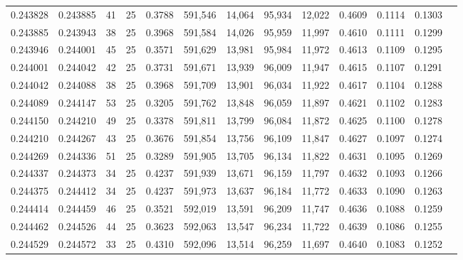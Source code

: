 \begin{tabular}{rrrrrrrrrrrrr}
0.243828 & 0.243885 &    41 &  25 &                                     0.3788 & 591,546 &  14,064 &  95,934 &  12,022 & 0.4609 & 0.1114 & 0.1303 \\
0.243885 & 0.243943 &    38 &  25 &                                     0.3968 & 591,584 &  14,026 &  95,959 &  11,997 & 0.4610 & 0.1111 & 0.1299 \\
0.243946 & 0.244001 &    45 &  25 &                                     0.3571 & 591,629 &  13,981 &  95,984 &  11,972 & 0.4613 & 0.1109 & 0.1295 \\
0.244001 & 0.244042 &    42 &  25 &                                     0.3731 & 591,671 &  13,939 &  96,009 &  11,947 & 0.4615 & 0.1107 & 0.1291 \\
0.244042 & 0.244088 &    38 &  25 &                                     0.3968 & 591,709 &  13,901 &  96,034 &  11,922 & 0.4617 & 0.1104 & 0.1288 \\
0.244089 & 0.244147 &    53 &  25 &                                     0.3205 & 591,762 &  13,848 &  96,059 &  11,897 & 0.4621 & 0.1102 & 0.1283 \\
0.244150 & 0.244210 &    49 &  25 &                                     0.3378 & 591,811 &  13,799 &  96,084 &  11,872 & 0.4625 & 0.1100 & 0.1278 \\
0.244210 & 0.244267 &    43 &  25 &                                     0.3676 & 591,854 &  13,756 &  96,109 &  11,847 & 0.4627 & 0.1097 & 0.1274 \\
0.244269 & 0.244336 &    51 &  25 &                                     0.3289 & 591,905 &  13,705 &  96,134 &  11,822 & 0.4631 & 0.1095 & 0.1269 \\
0.244337 & 0.244373 &    34 &  25 &                                     0.4237 & 591,939 &  13,671 &  96,159 &  11,797 & 0.4632 & 0.1093 & 0.1266 \\
0.244375 & 0.244412 &    34 &  25 &                                     0.4237 & 591,973 &  13,637 &  96,184 &  11,772 & 0.4633 & 0.1090 & 0.1263 \\
0.244414 & 0.244459 &    46 &  25 &                                     0.3521 & 592,019 &  13,591 &  96,209 &  11,747 & 0.4636 & 0.1088 & 0.1259 \\
0.244462 & 0.244526 &    44 &  25 &                                     0.3623 & 592,063 &  13,547 &  96,234 &  11,722 & 0.4639 & 0.1086 & 0.1255 \\
0.244529 & 0.244572 &    33 &  25 &                                     0.4310 & 592,096 &  13,514 &  96,259 &  11,697 & 0.4640 & 0.1083 & 0.1252 \\

\end{tabular}
